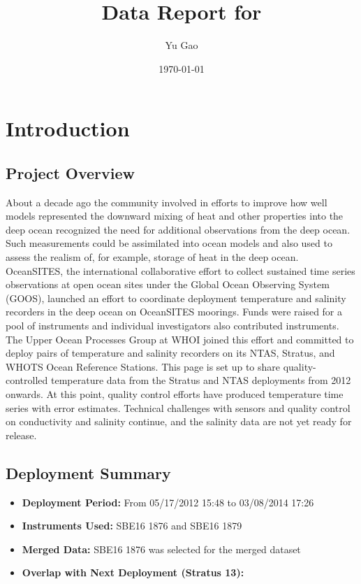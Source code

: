 \documentclass[11pt]{article}
\title{Data Report for \projectname{} \casenumber{}}
\author{Yu Gao}
\date{\today}
\newcommand{\projectname}{Stratus}  %
\newcommand{\nextcasenumber}{13}  %
\newcommand{\FirstInstrumentType}{SBE16}  %
\newcommand{\SecondInstrumentType}{SBE16}  %
\newcommand{\DeploymentSpike}{05/17/2012 15:48} %
\newcommand{\RecoverySpike}{03/08/2014 17:26} %
\newcommand{\FirstInstrument}{1876}
\newcommand{\SecondInstrument}{1879}
\newcommand{\CurrentDeploymentInstrument}{\FirstInstrumentType{} \FirstInstrument}
\begin{document}
\maketitle
\tableofcontents
\newpage

\section{Introduction}

\subsection{Project Overview}

About a decade ago the community involved in  efforts to improve how well models
represented the downward mixing of heat and other properties into the deep ocean
recognized the need for additional observations from the deep ocean.  Such measurements
could be assimilated into ocean models and also used to assess the realism of, for example,
storage of heat in the deep ocean.  OceanSITES, the international collaborative effort to collect sustained time series observations at open ocean sites under the Global Ocean Observing System
(GOOS), launched an effort to coordinate deployment temperature and salinity
recorders in the deep ocean on OceanSITES moorings. Funds were raised for a pool of
instruments and individual investigators also contributed instruments. The Upper Ocean
Processes Group at WHOI joined this effort and committed to deploy pairs of temperature and salinity recorders on its NTAS, Stratus, and WHOTS Ocean Reference Stations.  This page is set
up to share quality-controlled temperature data from the Stratus and NTAS deployments from
2012 onwards.  At this point, quality control efforts have produced temperature time series with
error estimates.  Technical challenges with sensors and quality control on conductivity and salinity continue, and the salinity data are not yet ready for release.

\subsection{Deployment Summary}
\begin{itemize}
    \item \textbf{Deployment Period:} From \DeploymentSpike{} to \RecoverySpike{}
    \item \textbf{Instruments Used:} \FirstInstrumentType{} \FirstInstrument{} and \SecondInstrumentType{} \SecondInstrument{}
    \item \textbf{Merged Data:} \CurrentDeploymentInstrument{} was selected for the merged dataset
    \item \textbf{Overlap with Next Deployment (\projectname{} \nextcasenumber{}):} \HasNextDeploymentOverlap{}
\end{itemize}
\end{document}
